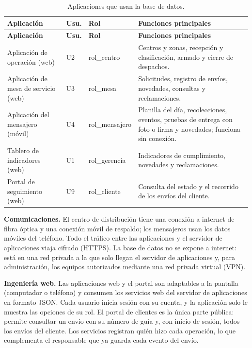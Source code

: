 {\singlespacing\small
\begin{longtable}{L{3.6cm} L{1.0cm} L{2.6cm} L{7.2cm}}
\caption{Aplicaciones que usan la base de datos.}
\label{tab:aplicaciones}\\
\toprule
\textbf{Aplicación} & \textbf{Usu.} & \textbf{Rol} & \textbf{Funciones principales} \\
\midrule
\endfirsthead
\toprule
\textbf{Aplicación} & \textbf{Usu.} & \textbf{Rol} & \textbf{Funciones principales} \\
\midrule
\endhead
\bottomrule
\endfoot
Aplicación de operación (web) & U2 & rol\_centro & Centros y zonas, recepción y clasificación, armado y cierre de despachos. \\
Aplicación de mesa de servicio (web) & U3 & rol\_mesa & Solicitudes, registro de envíos, novedades, consultas y reclamaciones. \\
Aplicación del mensajero (móvil) & U4 & rol\_mensajero & Planilla del día, recolecciones, eventos, pruebas de entrega con foto o firma y novedades; funciona sin conexión. \\
Tablero de indicadores (web) & U1 & rol\_gerencia & Indicadores de cumplimiento, novedades y reclamaciones. \\
Portal de seguimiento (web) & U9 & rol\_cliente & Consulta del estado y el recorrido de los envíos del cliente. \\
\end{longtable}
\par}

\textbf{Comunicaciones.} El centro de distribución tiene una conexión a
internet de fibra óptica y una conexión móvil de respaldo; los
mensajeros usan los datos móviles del teléfono. Todo el tráfico entre
las aplicaciones y el servidor de aplicaciones viaja cifrado (HTTPS). La
base de datos no se expone a internet: está en una red privada a la que
solo llegan el servidor de aplicaciones y, para administración, los
equipos autorizados mediante una red privada virtual (VPN).

\textbf{Ingeniería web.} Las aplicaciones web y el portal son
adaptables a la pantalla (computador o teléfono) y consumen los
servicios web del servidor de aplicaciones en formato JSON. Cada usuario
inicia sesión con su cuenta, y la aplicación solo le muestra las
opciones de su rol. El portal de clientes es la única parte pública:
permite consultar un envío con su número de guía y, con inicio de
sesión, todos los envíos del cliente. Los servicios registran quién
hizo cada operación, lo que complementa el responsable que ya guarda
cada evento del envío.
